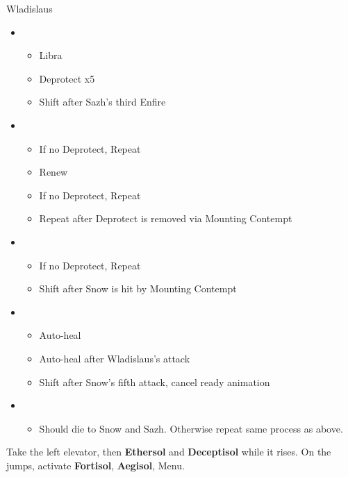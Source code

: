 	\begin{battle}[0:42]{Wladislaus}
		\begin{itemize}
			\item \third
			      \begin{itemize}
				      \item Libra
				      \item Deprotect x5
				      \item Shift after Sazh's third Enfire
			      \end{itemize}
			\item \second
			      \begin{itemize}
				      \item If no Deprotect, Repeat
				      \item Renew
				      \item If no Deprotect, Repeat
				      \item Repeat after Deprotect is removed via Mounting Contempt
			      \end{itemize}
			\item \third
			      \begin{itemize}
				      \item If no Deprotect, Repeat
				      \item Shift after Snow is hit by Mounting Contempt
			      \end{itemize}
			\item \first
			      \begin{itemize}
				      \item Auto-heal
				      \item Auto-heal after Wladislaus's attack
				      \item Shift after Snow's fifth attack, cancel ready animation
			      \end{itemize}
			\item \second
			      \begin{itemize}
				      \item Should die to Snow and Sazh. Otherwise repeat same process as above.
			      \end{itemize}
		\end{itemize}
	\end{battle}
	Take the left elevator, then \textbf{Ethersol} and \textbf{Deceptisol} while it rises. On the jumps, activate \textbf{Fortisol}, \textbf{Aegisol}, Menu.
